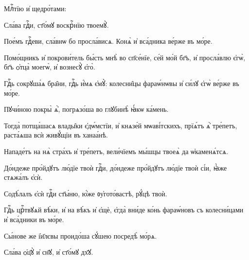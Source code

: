 
\label{prazd} 


\hKv Млⷭ҇тїю и҆  щедро́тами:  


\hKv Сла́ва гдⷭ҇и, ст҃о́мꙋ воскрⷭ҇нїю твоемꙋ̀. 


\hKv Пое́мъ гдⷭ҇еви, сла́внѡ бо просла́висѧ. Конѧ̀ и҆ вса́дника  ве́рже въ мо́ре. 
%


\hKv Помо́щникъ и҆ покрови́тель бы́сть мнѣ̀ во сп҃се́нїе, се́й  мо́й бг҃ъ, и҆ просла́влю є҆гѡ̀, бг҃ъ ѻ҆тца̀ моегѡ̀, и҆  вознесꙋ̀ є҆го̀. 
%

\hKv Гдⷭ҇ь сокрꙋша́ѧ бра̑ни, гдⷭ҇ь и҆́мѧ є҆мꙋ̀: колесни̑цы  фараѡ́нѡвы и҆ си́лꙋ є҆гѡ̀ ве́рже въ мо́ре. 

\hKv Пꙋчи́ною покры̀ ѧ҆̀, погрѧзо́ша во глꙋбинѣ̀ ꙗ҆́кѡ ка́мень. 
%

\hKv Тогда̀ потща́шасѧ влады̑ки є҆дѡ́мстїи, и҆ кнѧзе́й  мѡаві́тскихъ, прїѧ́тъ ѧ҆̀  тре́петъ, раста́ѧша всѝ живꙋ́щїи  въ ханаа́нѣ. 

\hKv Нападе́тъ на нѧ̀ стра́хъ и҆ тре́петъ, вели́чїемъ мы́шцы  твоеѧ̀ да ѡ҆каменѧ́тсѧ.  
%

\hKv До́ндеже про́йдꙋтъ лю́дїе твоѝ гдⷭ҇и, до́ндеже  про́йдꙋтъ лю́дїе твоѝ сі́и, ꙗ҆̀же стѧжа́лъ є҆сѝ. 

\hKv Содѣ́лалъ є҆сѝ гдⷭ҇и ст҃ы́ню, ю҆́же ᲂу҆гото́вастѣ,  рꙋ́цѣ твоѝ. 
%

\hKv Гдⷭ҇ь црⷭ҇твꙋѧй вѣ́ки, и҆ на вѣ́къ и҆ є҆щѐ,  є҆гда̀ вни́де ко́нь фараѡ́новъ съ колесни́цами и҆ вса́дники  въ мо́ре. 

\hKv Сы́нове же і҆и҃лєвы проидо́ша сꙋ́шею посредѣ̀ мо́рѧ. 

\hKv Сла́ва ѻ҆ц҃ꙋ̀ и҆ сн҃ꙋ, и҆ ст҃о́мꙋ дх҃ꙋ. 

